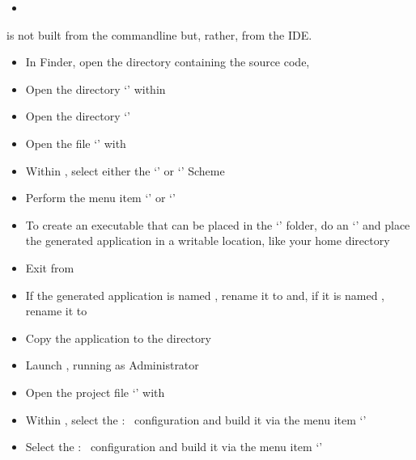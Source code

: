 \tertiaryEnd
{}
\begin{itemize}
\item\TBD
\end{itemize}
\tertiaryEnd
\secondaryEnd
{}
\textit{\MMMU} is not built from the command\longDash{}line but, rather, from the IDE.
\begin{itemize}
\item In Finder, open the directory containing the \mplusm{} source code,
\item\exSp{}Open the directory `' within
\item\exSp{}Open the directory `'
\item\exSp{}Open the file `' with 
\item\exSp{}Within , select either the `' or
`' Scheme
\item\exSp{}Perform the menu item `' or
`'
\item\exSp{}To create an executable that can be placed in the `'
folder, do an `'
and place the generated application in a writable location, like your home directory
\item\exSp{}Exit from 
\item\exSp{}If the generated application is named , rename
it to  and, if it is named ,
rename it to 
\item\exSp{}Copy the  application to the 
directory
\end{itemize}
\tertiaryEnd
{}
\begin{itemize}
\item Launch , running as Administrator
\item\exSp{}Open the project file
`' with
\item\exSp{}Within , select the  :\ 
configuration and build it via the menu item
`'
\item\exSp{}Select the  :\  configuration and build it via
the menu item `'
\end{itemize}
